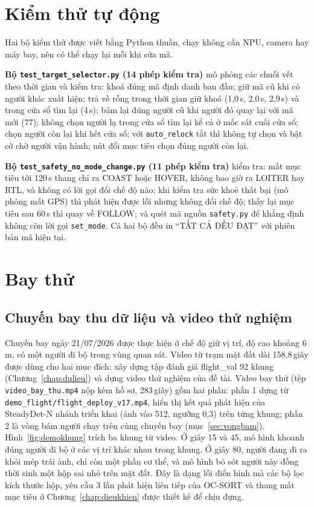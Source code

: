 \section{Kiểm thử tự động}

Hai bộ kiểm thử được viết bằng Python thuần, chạy không cần NPU, camera hay máy bay, nên có thể chạy lại mỗi khi sửa mã.

\textbf{Bộ \texttt{test\_target\_selector.py} (14 phép kiểm tra)} mô phỏng các chuỗi vết theo thời gian và kiểm tra: khoá đúng mã định danh ban đầu; giữ mã cũ khi có người khác xuất hiện; trả về rỗng trong thời gian giữ khoá (1,0\,s, 2,0\,s, 2,9\,s) và trong cửa sổ tìm lại (4\,s); bám lại đúng người cũ khi người đó quay lại với mã mới (77); không chọn người lạ trong cửa sổ tìm lại kể cả ở mốc sát cuối cửa sổ; chọn người còn lại khi hết cửa sổ; với \texttt{auto\_relock} tắt thì không tự chọn và bật cờ chờ người vận hành; nút đổi mục tiêu chọn đúng người còn lại.

\textbf{Bộ \texttt{test\_safety\_no\_mode\_change.py} (11 phép kiểm tra)} kiểm tra: mất mục tiêu tới 120\,s thang chỉ ra COAST hoặc HOVER, không bao giờ ra LOITER hay RTL, và không có lời gọi đổi chế độ nào; khi kiểm tra sức khoẻ thất bại (mô phỏng mất GPS) thì phát hiện được lỗi nhưng không đổi chế độ; thấy lại mục tiêu sau 60\,s thì quay về FOLLOW; và quét mã nguồn \texttt{safety.py} để khẳng định không còn lời gọi \texttt{set\_mode}.
Cả hai bộ đều in ``TẤT CẢ ĐỀU ĐẠT'' với phiên bản mã hiện tại.

\section{Bay thử}
\label{sec:baythu}

\subsection{Chuyến bay thu dữ liệu và video thử nghiệm}

Chuyến bay ngày 21/07/2026 được thực hiện ở chế độ giữ vị trí, độ cao khoảng 6\,m, có một người đi bộ trong vùng quan sát. Video từ trạm mặt đất dài 158,8\,giây được dùng cho hai mục đích: xây dựng tập đánh giá flight\_val 92 khung (Chương~\ref{chap:dulieu}) và dựng video thử nghiệm của đề tài. Video bay thử (tệp \texttt{video\_bay\_thu.mp4} nộp kèm hồ sơ, 283\,giây) gồm hai phần: phần 1 dựng từ \texttt{demo\_flight/flight\_deploy\_v17.mp4}, hiển thị kết quả phát hiện của SteadyDet-N nhánh triển khai (ảnh vào 512, ngưỡng 0,3) trên từng khung; phần 2 là vòng bám người chạy trên cùng chuyến bay (mục~\ref{sec:vongbam}). Hình~\ref{fig:demokhung} trích ba khung từ video. Ở giây 15 và 45, mô hình khoanh đúng người đi bộ ở các vị trí khác nhau trong khung. Ở giây 80, người đang đi ra khỏi mép trái ảnh, chỉ còn một phần cơ thể, và mô hình bỏ sót người này đồng thời sinh một hộp sai nhỏ trên mặt đất. Đây là dạng lỗi điển hình mà các bộ lọc kích thước hộp, yêu cầu 3 lần phát hiện liên tiếp của OC-SORT và thang mất mục tiêu ở Chương~\ref{chap:dieukhien} được thiết kế để chịu đựng.

